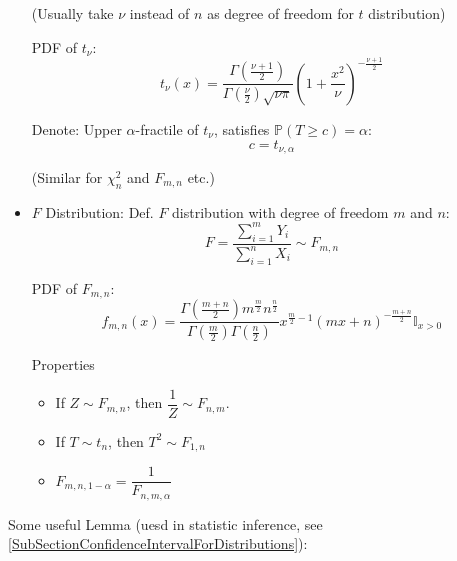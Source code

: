 \begin{itemize}
            (Usually take $\nu$ instead of $n$ as degree of freedom for $ t $ distribution)

            PDF of $t_\nu$:
            \begin{equation}        
                t_\nu(x)=\dfrac{\Gamma(\frac{\nu+1}{2})}{\Gamma(\frac{\nu}{2})\sqrt{\nu\pi}}\left(1+\frac{x^2}{\nu}\right)^{-\frac{\nu+1}{2}}
            \end{equation}

            Denote: Upper $\alpha$-fractile of $t_\nu$, satisfies $\mathbb{P}(T\geq c)=\alpha$:
            \begin{equation}        
                c=t_{\nu,\alpha}
            \end{equation}
            
            (Similar for $\chi^2_n$ and $F_{m,n}$ etc.)
            \item $F$ Distribution: Def. $F$ distribution with degree of freedom $m$ and $n$:
            \begin{equation}        
                F=\frac{\sum_{i=1}^mY_i}{\sum_{i=1}^nX_i}\sim F_{m,n}
            \end{equation}

            PDF of $F_{m,n}$:
            \begin{equation}        
                f_{m,n}(x)=\frac{\Gamma(\frac{m+n}{2})m^\frac{m}{2}n^{\frac{n}{2}}}{\Gamma(\frac{m}{2})\Gamma(\frac{n}{2})}x^{\frac{m}{2}-1}(mx+n)^{-\frac{m+n}{2}} \mathbb{I}_{x>0}
            \end{equation}

            Properties
            \begin{itemize}
                \item If $Z\sim F_{m,n}$, then $\dfrac{1}{Z}\sim F_{n,m}$.
                \item If $T\sim t_n$, then $T^2\sim F_{1,n}$
                \item $F_{m,n,1-\alpha}=\dfrac{1}{F_{n,m,\alpha}}$
            \end{itemize}
        \end{itemize}

        \begin{point}
            Some useful Lemma (uesd in statistic inference, see \autoref{SubSectionConfidenceIntervalForDistributions}):
        \end{point}
        
